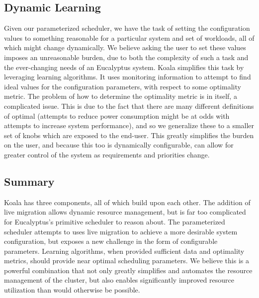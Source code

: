\subsection{Dynamic Learning}
Given our parameterized scheduler, we have the task of setting the configuration values to something reasonable for a particular system and set of workloads, all of which might change dynamically.  We believe asking the user to set these values imposes an unreasonable burden, due to both the complexity of such a task and the ever-changing needs of an Eucalyptus system.  Koala simplifies this task by leveraging learning algorithms.  It uses monitoring information to attempt to find ideal values for the configuration parameters, with respect to some optimality metric.  The problem of how to determine the optimality metric is in itself, a complicated issue.  This is due to the fact that there are many different definitions of optimal (attempts to reduce power consumption might be at odds with attempts to increase system performance), and so we generalize these to a smaller set of knobs which are exposed to the end-user.  This greatly simplifies the burden on the user, and because this too is dynamically configurable, can allow for greater control of the system as requirements and priorities change.

\subsection{Summary}

Koala has three components, all of which build upon each other.  The addition of live migration allows dynamic resource management, but is far too complicated for Eucalyptus's primitive scheduler to reason about.  The parameterized scheduler attempts to uses live migration to achieve a more desirable system configuration, but exposes a new challenge in the form of configurable parameters.  Learning algorithms, when provided sufficient data and optimality metrics, should provide near optimal scheduling parameters.  We believe this is a powerful combination that not only greatly simplifies and automates the resource management of the cluster, but also enables significantly improved resource utilization than would otherwise be possible.
